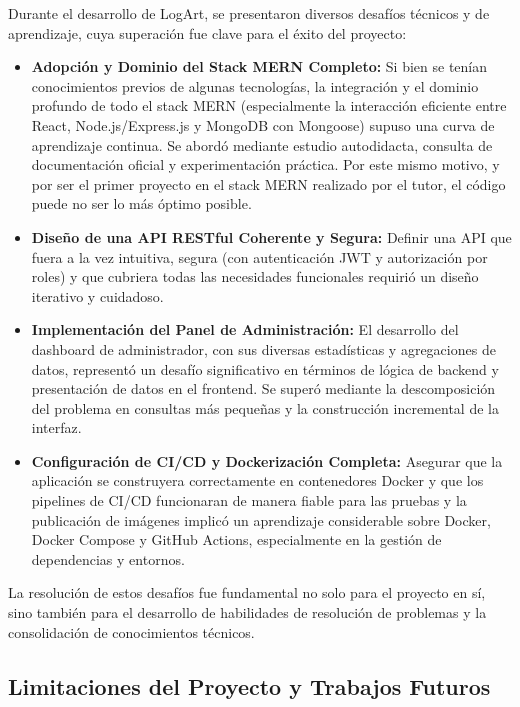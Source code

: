 Durante el desarrollo de LogArt, se presentaron diversos desafíos técnicos y de aprendizaje, cuya superación fue clave para el éxito del proyecto:
\begin{itemize}
    \item \textbf{Adopción y Dominio del Stack MERN Completo:} Si bien se tenían conocimientos previos de algunas tecnologías, la integración y el dominio profundo de todo el stack MERN (especialmente la interacción eficiente entre React, Node.js/Express.js y MongoDB con Mongoose) supuso una curva de aprendizaje continua. Se abordó mediante estudio autodidacta, consulta de documentación oficial y experimentación práctica. Por este mismo motivo, y por ser el primer proyecto en el stack MERN realizado por el tutor, el código puede no ser lo más óptimo posible.
    \item \textbf{Diseño de una API RESTful Coherente y Segura:} Definir una API que fuera a la vez intuitiva, segura (con autenticación JWT y autorización por roles) y que cubriera todas las necesidades funcionales requirió un diseño iterativo y cuidadoso.
    \item \textbf{Implementación del Panel de Administración:} El desarrollo del dashboard de administrador, con sus diversas estadísticas y agregaciones de datos, representó un desafío significativo en términos de lógica de backend y presentación de datos en el frontend. Se superó mediante la descomposición del problema en consultas más pequeñas y la construcción incremental de la interfaz.
    \item \textbf{Configuración de CI/CD y Dockerización Completa:} Asegurar que la aplicación se construyera correctamente en contenedores Docker y que los pipelines de CI/CD funcionaran de manera fiable para las pruebas y la publicación de imágenes implicó un aprendizaje considerable sobre Docker, Docker Compose y GitHub Actions, especialmente en la gestión de dependencias y entornos.
\end{itemize}
La resolución de estos desafíos fue fundamental no solo para el proyecto en sí, sino también para el desarrollo de habilidades de resolución de problemas y la consolidación de conocimientos técnicos.

\subsection{Limitaciones del Proyecto y Trabajos Futuros}
\label{ssec:limitacionesproyecto}

